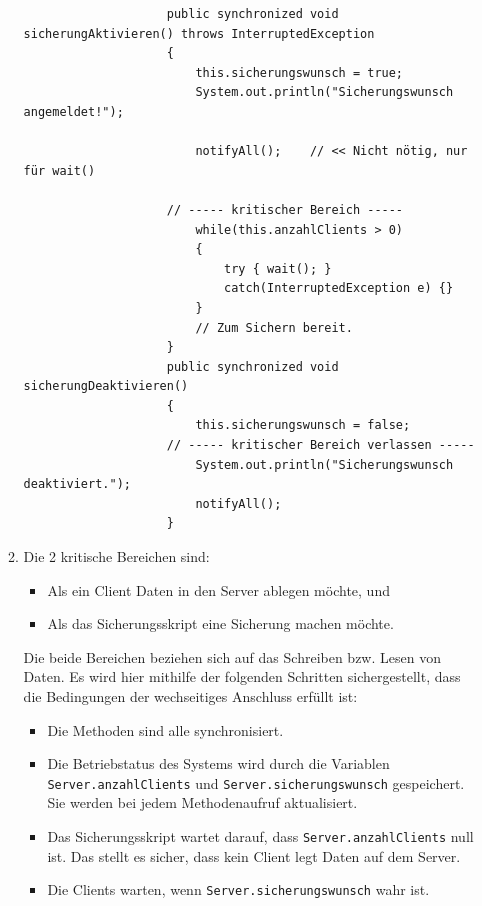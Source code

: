 \begin{enumerate}[label={Aufgabe H\arabic*},start=31]
\begin{enumerate}
                \begin{verbatim}
                    public synchronized void sicherungAktivieren() throws InterruptedException
                    {
                        this.sicherungswunsch = true;
                        System.out.println("Sicherungswunsch angemeldet!");
                
                        notifyAll();    // << Nicht nötig, nur für wait()
                        
                    // ----- kritischer Bereich -----
                        while(this.anzahlClients > 0)
                        {
                            try { wait(); }
                            catch(InterruptedException e) {}
                        }
                        // Zum Sichern bereit.
                    }   
                    public synchronized void sicherungDeaktivieren()
                    {
                        this.sicherungswunsch = false;
                    // ----- kritischer Bereich verlassen -----
                        System.out.println("Sicherungswunsch deaktiviert.");
                        notifyAll();
                    }
                \end{verbatim}
            \item Die 2 kritische Bereichen sind:
                \begin{itemize}
                    \item Als ein Client Daten in den Server ablegen möchte, und
                    \item Als das Sicherungsskript eine Sicherung machen möchte.
                \end{itemize}



                Die beide Bereichen beziehen sich auf das Schreiben bzw. Lesen von Daten. Es wird hier mithilfe der folgenden Schritten sichergestellt, dass die Bedingungen der wechseitiges Anschluss erfüllt ist:
                \begin{itemize}
                    \item Die Methoden sind alle synchronisiert. 
                    \item Die Betriebstatus des Systems wird durch die Variablen \texttt{Server.anzahlClients} und \texttt{Server.sicherungswunsch} gespeichert. Sie werden bei jedem Methodenaufruf aktualisiert.
                    \item Das Sicherungsskript wartet darauf, dass \texttt{Server.anzahlClients} null ist. Das stellt es sicher, dass kein Client legt Daten auf dem Server.
                    \item Die Clients warten, wenn \texttt{Server.sicherungswunsch} wahr ist. 


\end{itemize}
\end{enumerate}
\end{enumerate}
